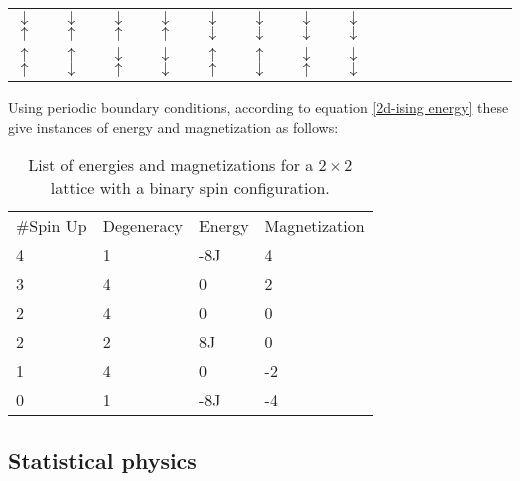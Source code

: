 \documentclass[10pt,a4paper]{article}
\begin{document}
\begin{table}[H]
\begin{tabular}{llllllllllllllll}
 $\downarrow$ $\uparrow$ & $\downarrow$ $\uparrow$ & $\downarrow$ $\uparrow$ & $\downarrow$ $\uparrow$ & $\downarrow$ $\downarrow$ & $\downarrow$ $\downarrow$ &  $\downarrow$ $\downarrow$ & $\downarrow$ $\downarrow$ \\
 $\uparrow$ $\uparrow$ & $\uparrow$ $\downarrow$ & $\downarrow$ $\uparrow$ & $\downarrow$ $\downarrow$ & $\uparrow$ $\uparrow$ & $\uparrow$ $\downarrow$ & $\downarrow$ $\uparrow$ & $\downarrow$ $\downarrow$
\end{tabular}
\end{table}
Using periodic boundary conditions, according to equation \ref{2d-ising energy} these give instances of energy and magnetization as follows:
\begin{table}[H]
\caption[energies and magnetizations for a $2\times2$ lattice]{List of energies and magnetizations for a $2\times2$ lattice with a binary spin configuration.}
\begin{tabular}{llll}
\#Spin Up & Degeneracy & Energy & Magnetization \\
4         & 1          & -8J    & 4             \\
3         & 4          & 0      & 2             \\
2         & 4          & 0      & 0             \\
2         & 2          & 8J     & 0             \\
1         & 4          & 0      & -2            \\
0         & 1          & -8J    & -4           
\end{tabular}
\label{energies and magnetizations for a 2x2 lattice}
\end{table}
\subsection{Statistical physics}
\end{document}
